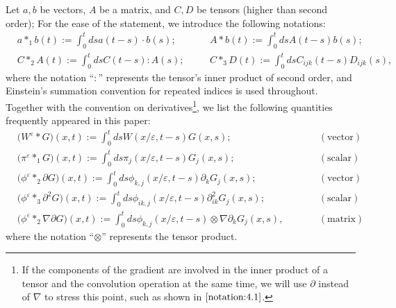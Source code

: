 \documentclass[13pt,CJK]{article}
\theoremstyle{plain}                       %
\theoremstyle{remark}
\numberwithin{equation}{section}
\begin{document}
\begin{enumerate}
Let $a,b$ be vectors, $A$ be a matrix, and $C,D$ be tensors (higher than second order); For the ease of the statement, we introduce the following notations:
\begin{equation}\label{notation:4.2}
\begin{aligned}
&a\ast_{1} b(t) := \int_{0}^{t}ds a(t-s)\cdot b(s);
&\quad&
A\ast b(t) := \int_{0}^{t}ds A(t-s)b(s); \\
&C\ast_{2} A(t) := \int_{0}^{t}ds C(t-s):A(s);
&\quad&
C\ast_{3} D(t) := \int_{0}^{t}ds C_{ijk}(t-s)D_{ijk}(s),
\end{aligned}
\end{equation}
where the notation ``$:$'' represents the tensor's inner product of second order, and Einstein's summation convention for repeated indices is used throughout.
Together with the convention on derivatives\footnote{
If the components of the gradient are involved in the inner product of a tensor
and the convolution operation at the same time,
we will use $\partial$ instead of $\nabla$ to stress this point,
such as shown in $\eqref{notation:4.1}$.}, we list the following quantities frequently appeared in this paper:
\begin{equation}\label{notation:4.1}
\begin{aligned}
&\big(W^\varepsilon\ast G\big)(x,t)
:= \int_{0}^{t}dsW(x/\varepsilon,t-s)G(x,s);
&\qquad&(\text{vector})\\
&\big(\pi^{\varepsilon}\ast_{1} G\big)(x,t)
:= \int_{0}^{t}ds\pi_{j}(x/\varepsilon,t-s) G_j(x,s); &\qquad&(\text{scalar})\\
&\big(\phi^\varepsilon\ast_2\partial G\big)(x,t)
:= \int_{0}^{t}ds\phi_{k,j}(x/\varepsilon,t-s)\partial_kG_j(x,s);
&\qquad&(\text{vector})\\
&\big(\phi^{\varepsilon}\ast_3\partial^2G\big)(x,t)
:=\int_{0}^{t}ds\phi_{ik,j}(x/\varepsilon,t-s)\partial_{ik}^2G_j(x,s);
&\qquad&(\text{scalar})\\
&\big(\phi^\varepsilon\ast_2\nabla\partial G\big)(x,t)
:=\int_{0}^{t}ds\phi_{k,j}(x/\varepsilon,t-s)\otimes\nabla\partial_kG_j(x,s),
&\qquad&(\text{matrix})
\end{aligned}
\end{equation}
where the notation ``$\otimes$'' represents the tensor product. 

\end{enumerate}
\end{document}
